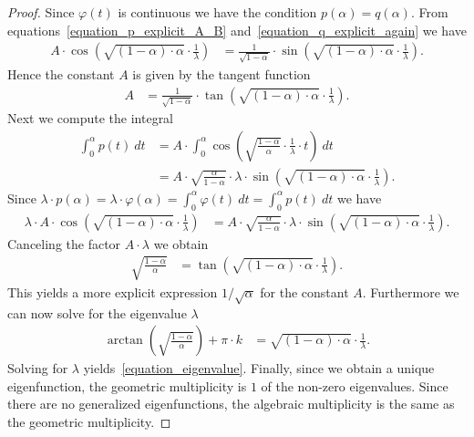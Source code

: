 \documentclass[11pt,reqno]{amsart}
\theoremstyle{definition}
\numberwithin{equation}{section}
\begin{document}
\begin{proof}
Since $\varphi(t)$ is continuous we have
the condition $p(\alpha) = q(\alpha)$.
From equations~\eqref{equation_p_explicit_A_B}
and~\eqref{equation_q_explicit_again}
we have
\begin{align*}
A \cdot \cos\left( \sqrt{(1-\alpha) \cdot \alpha} \cdot \frac{1}{\lambda} \right)
& =
\frac{1}{\sqrt{1-\alpha}}
\cdot
\sin\left( \sqrt{(1-\alpha) \cdot \alpha} \cdot \frac{1}{\lambda} \right) .
\end{align*}
Hence the constant $A$ is given by the tangent function
\begin{align*}
A
& =
\frac{1}{\sqrt{1-\alpha}}
\cdot
\tan\left( \sqrt{(1-\alpha) \cdot \alpha} \cdot \frac{1}{\lambda} \right) .
\end{align*}
Next we compute the integral
\begin{align*}
\int_{0}^{\alpha} p(t) \: dt
& =
A \cdot 
\int_{0}^{\alpha} 
\cos\left( \sqrt{\frac{1-\alpha}{\alpha}} \cdot \frac{1}{\lambda} \cdot  t \right)
\: dt
\\
& =
A \cdot 
\sqrt{\frac{\alpha}{1-\alpha}} \cdot \lambda \cdot
\sin\left( \sqrt{(1-\alpha) \cdot \alpha} \cdot \frac{1}{\lambda} \right) .
\end{align*}
Since
$\lambda \cdot p(\alpha)
= \lambda \cdot \varphi(\alpha)
= \int_{0}^{\alpha} \varphi(t) \: dt
= \int_{0}^{\alpha} p(t) \: dt$
we have
\begin{align*}
\lambda \cdot
A \cdot \cos\left( \sqrt{(1-\alpha) \cdot \alpha} \cdot \frac{1}{\lambda} \right)
& =
A \cdot 
\sqrt{\frac{\alpha}{1-\alpha}} \cdot \lambda \cdot
\sin\left( \sqrt{(1-\alpha) \cdot \alpha} \cdot \frac{1}{\lambda} \right).
\end{align*}
Canceling the factor $A \cdot \lambda$
we obtain
\begin{align*}
\sqrt{\frac{1-\alpha}{\alpha}}
& =
\tan\left( \sqrt{(1-\alpha) \cdot \alpha} \cdot \frac{1}{\lambda} \right) .
\end{align*}
This yields a more explicit expression
$1/\sqrt{\alpha}$ for the constant $A$.
Furthermore we can now solve for the eigenvalue $\lambda$
\begin{align*}
\arctan\left(\sqrt{\frac{1-\alpha}{\alpha}}\right)
+
\pi \cdot k
& =
\sqrt{(1-\alpha) \cdot \alpha} \cdot \frac{1}{\lambda} .
\end{align*}
Solving for $\lambda$ yields~\eqref{equation_eigenvalue}.
Finally, since we obtain a unique eigenfunction,
the geometric multiplicity is $1$ of the non-zero eigenvalues.
Since there are no generalized eigenfunctions,
the algebraic multiplicity is the same as the geometric multiplicity.
\end{proof}
\end{document}
